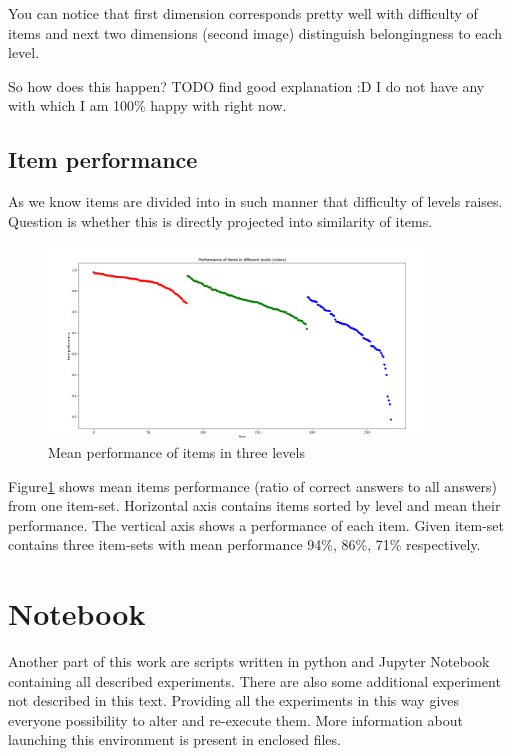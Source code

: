 \documentclass[
  digital, %
  table,   %
  nolof,     %
  nolot,     %
  nocover
]{fithesis3}
\begin{document}
You can notice that first dimension corresponds pretty well with difficulty of items and next two dimensions (second image) distinguish belongingness to each level.


So how does this happen? TODO find good explanation :D I do not have any with which I am 100\% happy with right now.


\subsection{Item performance}\label{item-performance}

As we know items are divided into in such manner that difficulty of levels raises. Question is whether this is directly projected into similarity of items.

\begin{figure}
  \includegraphics[width=10cm]{img/items_performance_levels}
  \caption{Mean performance of items in three levels}
  \label{fig:item_performance_levels}
\end{figure}

Figure\ref{fig:item_performance_levels} shows mean items performance (ratio of correct answers to all answers) from one item-set. Horizontal axis contains items sorted by level and mean their performance. The vertical axis shows a performance of each item. Given item-set contains three item-sets with mean performance 94\%, 86\%, 71\% respectively.


\section{Notebook}\label{notebook}

Another part of this work are scripts written in python and Jupyter Notebook containing all described experiments. There are also some additional experiment not described in this text. Providing all the experiments in this way gives everyone possibility to alter and re-execute them. More information about launching this environment is present in enclosed files.
\end{document}
